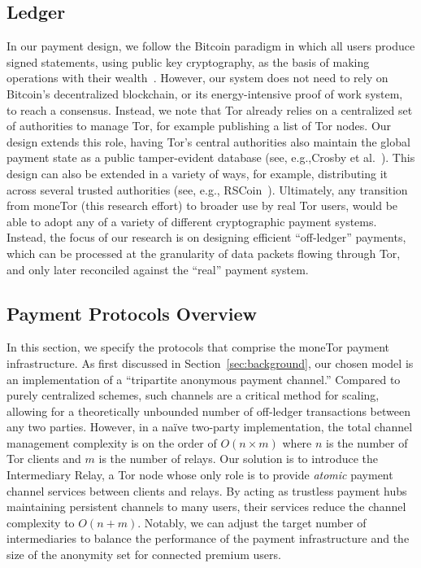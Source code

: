 \subsection{Ledger}

In our payment design, we follow the Bitcoin paradigm in which all users produce signed statements, using public key cryptography, as the basis of making operations with their wealth~\cite{nakamoto2008bitcoin}.
However, our system does not need to rely on Bitcoin's decentralized blockchain, or its energy-intensive proof of work system, to reach a consensus.
Instead, we note that Tor already relies on a centralized set of authorities to manage Tor, for example publishing a list of Tor nodes.
Our design extends this role, having Tor's central authorities also maintain the global payment state as a public tamper-evident database (see, e.g.,Crosby et al.~\cite{crosby2009efficient}). 
This design can also be extended in a variety of ways, for example, distributing it across several trusted authorities (see, e.g., RSCoin~\cite{danezis2015centrally}).
Ultimately, any transition from moneTor (this research effort) to broader use by real Tor users, would be able to adopt any of a variety of different cryptographic payment systems. 
Instead, the focus of our research is on designing efficient ``off-ledger'' payments, which can be processed at the granularity of data packets flowing through Tor, and only later reconciled against the ``real'' payment system.

\subsection{Payment Protocols Overview}
\label{sec:payment_overview}

In this section, we specify the protocols that comprise the moneTor payment infrastructure.
As first discussed in Section~\ref{sec:background}, our chosen model is an implementation of a ``tripartite anonymous payment channel.''
Compared to purely centralized schemes, such channels are a critical method for scaling, allowing for a theoretically unbounded number of off-ledger transactions between any two parties.
However, in a na\"{i}ve two-party implementation, the total channel management complexity is on the order of $O(n \times m)$ where $n$ is the number of Tor clients and $m$ is the number of relays.
Our solution is to introduce the Intermediary Relay, a Tor node whose only role is to provide \emph{atomic} payment channel services between clients and relays.
By acting as trustless payment hubs maintaining persistent channels to many users, their services reduce the channel complexity to $O(n+m)$.
Notably, we can adjust the target number of intermediaries to balance the performance of the payment infrastructure and the size of the anonymity set for connected premium users.


